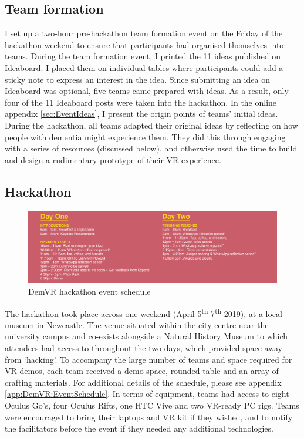 \subsection{Team formation}
\label{sec:TeamFormation}
I set up a two-hour pre-hackathon team formation event on the Friday of the hackathon weekend to ensure that participants had organised themselves into teams. During the team formation event, I printed the 11 ideas published on Ideaboard. I placed them on individual tables where participants could add a sticky note to express an interest in the idea. Since submitting an idea on Ideaboard was optional, five teams came prepared with ideas. As a result, only four of the 11 Ideaboard posts were taken into the hackathon. In the online appendix \ref{sec:EventIdeas}, I present the origin points of teams’ initial ideas. During the hackathon, all teams adapted their original ideas by reflecting on how people with dementia might experience them. They did this through engaging with a series of resources (discussed below), and otherwise used the time to build and design a rudimentary prototype of their VR experience. 

\subsection{Hackathon}
\label{sec:HackathonEvent}
\begin{figure}[htp]
\centering
\includegraphics[width=1\linewidth]{Images/DemVR/DemVRHackathonSchedule.png}
\caption{DemVR hackathon event schedule}
\label{fig:schedule}
\end{figure}
The hackathon took place across one weekend (April 5\textsuperscript{th}-7\textsuperscript{th} 2019), at a local museum in Newcastle. The venue situated within the city centre near the university campus and co-exists alongside a Natural History Museum to which attendees had access to throughout the two days, which provided space away from `hacking'. To accompany the large number of teams and space required for VR demos, each team received a demo space, rounded table and an array of crafting materials. For additional details of the schedule, please see appendix \ref{app:DemVR:EventSchedule}. In terms of equipment, teams had access to eight Oculus Go’s, four Oculus Rifts, one HTC Vive and two VR-ready PC rigs. Teams were encouraged to bring their laptops and VR kit if they wished, and to notify the facilitators before the event if they needed any additional technologies.

